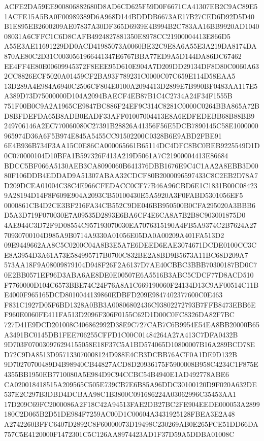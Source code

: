 \documentclass[UTF8,fontset=fandol,zihao=-4,a4paper]{ctexart}
\begin{document}
{{ACFE2DA59EE900806882680D8AD6CD625F59D0F6671CA41307EB2C9AC89E51ACFE15A5BA0F00989389D6A968D144BDDDB6673AE17B27CED6D92D5D40
B1E895EB2600209AE07837A30DF365D6939E4B994B2C783AA16BB9920AD104008031A6CFFC1C6D8CAFB4924827881350E8978CC21900004413E866D5
A55E3AE11691229DD0ACD41985073A0060BE32C9E8A6A55E3A219DA8174DA870AE80C2D31C0030561966441347E6767BBA77ED9A5D144DA86DC67462
EE4FF4E80E00609945372F8EEE95D610E904A7D209DD29134DF8D80C0060A632CC8826ECF5020A01459CF2BA93F789231C0000C07C659E114D58EAA5
13D289A4E984A6940C2506CF804E0100A2094413D2899E7B990BF0483AA117E5A389D73D75000000D104A2094BAECF4EB87B1C4C2734A24F34F1555B
751F00B0C9A2A1965CE9847BC886F24EF9C314C8281C0000C0264BBA865A72BD8BFDEFDA65B8ADB0EADF33AFF01007004413E8A6EDFEDEBB68B88BB9
249706146A2EC770060080C27391B28826A41356F56E5DCB7890145C58E1000000965974D36A6F5B974E845A5455CC91502200C0328B6E9ABD2FBE91
6E4B936B734F3AA15C0E86CA000065661B65114DC4DFC8BC0BEB9225549D1D0C070000104D10BFA1B597326F413A219D5061A7C21900004413E86684
BDCC5BF066A5130AEB3CA8090060B641376DBB1676E9C4C1AA2A8EBB3D0080F106DDB4EDDAD9A51307ABAA32CDCF80B2000096597433C8C2EB2D78A7
D209DCEA01004C38C4E966CFEDACC0CF77B46A96CBD6E1C1831B00C084239A28194D14F8F609E904A2093CB50100430E5A5920A3F0FABD5301056EF5
0000861CB4D2CE3BF216FA34CB552C9DE046BB950500B0CFA295020A3BBB6D5A3D719F070030E7A09535D2893E6BA6CF4E6CA8A7B2B8C903001875D0
4AE944C3D72F9D08554C957193070030EA7076315190A4FB5A9374C2B7624A2770930700104D985A9B0714A9330A01056E05DA0A00209A401FA513D2
09E9449662AA8C5C0200C04A8B3E5A7E6DEED6EAE3074671DCDE0100CC3CE8A3954D3A61A73E584995717B0700C832BE2A8BD9B5673A11BC68D209A7
573AA18F9A08009879104D948F26F2A6137D7AE40CBBC3BBB70300187BD0C70E2BB0571EF96D3ABA6AE8DE0E00507E6A5516B3ABC5CDCF77D8ACD510
F7760000D104C6573BBE74C24F76A8A1C669190060F24134D13C9AF00514C11BE4000F965165DCD8010044139860EDBFD209E9847402377600C0E463
F831C1927D05F6BD1328A0BB3A00806802436C93802272793B7FFB8473EBB6EF960E0060FE411FA513D2096F306F0155C62D1D00C0FC8326DA82F7BC
727D41E9DCD201008C406862992D38E9C727CAB7C6B9954E54EA8BB20000B65A3491BC0145DB1FEE706255CFFD1C00C01484264A27A413C7DFA0432B
9D703F070030976294155058E18F37C5A1BD574065D10800007B16A289BCD78ED72C9DA8513D957133070008124D988E4CB3DCBB76ACF0A1DE9D132B
9D70270700489D4B98940CB44827ACD8D20936175F5900008B958C4234C1F875E4355BB1950EB7710080A5E984D9C94CCBC54B4940E1AD492778ABE6
CA020018418515A209565C505E739CB7E6B85A96DDC30100120D9F020A632DE537E2C297B3DBD4DCBAA98C1B3800C091686224A03062996C35453AA1
17D209C69FC2000086A2F18C42A94513FAE2DB27BC2FE904EEDE000053A2899180C2D065B2D51DE984F7259AC00D1C00604A3431925128FBEA3E2A48
A2742260BFFC6407D2892C8F60000073D19498C230269AB0E265FCE51DD66DA757C5E4120000F1472301C5C126AA8974423AD1F37D59A5DDBA01008C
}}
\end{document}
